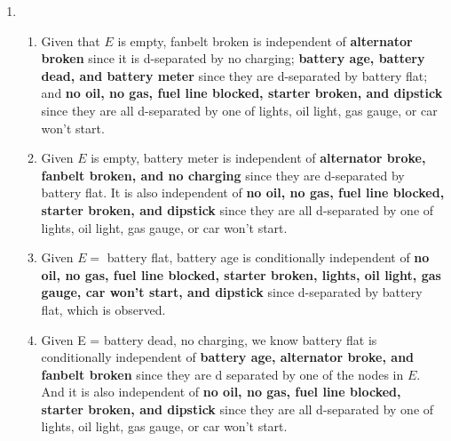 \documentclass[12pt,oneside,reqno]{amsart}
\theoremstyle{plain}
\theoremstyle{definition}
\theoremstyle{remark}
\newtheorem{rem}[theorem]{Remark}
\begin{document}
\begin{enumerate}[label=\arabic*.]
\begin{enumerate}
\item \textit{Prove that if $A$ and $B,C$ are conditionally independent given $D$, then $A,B$ are conditionally independent given $D$. }

\begin{proof}
Since $A$ and $B,C$ are conditionally independent given $D$, we know:
$$
P(A|B,C,D) = P(A|D).
$$
We want to show:
$$
P(A|B,D) = P(A|D).
$$
Note that $P(B) = P(B,C|P(C) = 1)$. So we have:
$$
P(A|B,D) = P(A|B,C,D|P(C) = 1) = P(A|D).
$$
So we have the desired result. 
\end{proof}
\end{enumerate}

\begin{rem}
Know this is as well, it's really easy, just $d$-separation. If there's any single directed path that isn't d separated, then they're dependent. 
\end{rem}

\item \begin{enumerate}
\item Given that $E$ is empty, fanbelt broken is independent of \textbf{alternator broken} since it is d-separated by no charging; \textbf{battery age, battery dead, and battery meter} since they are d-separated by battery flat; and \textbf{no oil, no gas, fuel line blocked, starter broken, and dipstick} since they are all d-separated by one of lights, oil light, gas gauge, or car won't start. 

\item Given $E$ is empty, battery meter is independent of \textbf{alternator broke, fanbelt broken, and no charging} since they are d-separated by battery flat. It is also independent of \textbf{no oil, no gas, fuel line blocked, starter broken, and dipstick} since they are all d-separated by one of lights, oil light, gas gauge, or car won't start. 

\item Given $E = $ battery flat, battery age is conditionally independent of \textbf{no oil, no gas, fuel line blocked, starter broken, lights, oil light, gas gauge, car won't start, and dipstick} since d-separated by battery flat, which is observed. 


\item Given E = battery dead, no charging, we know battery flat is conditionally independent of \textbf{battery age, alternator broke, and fanbelt broken} since they are d separated by one of the nodes in $E$. And it is also independent of \textbf{no oil, no gas, fuel line blocked, starter broken, and dipstick} since they are all d-separated by one of lights, oil light, gas gauge, or car won't start. 


\end{enumerate}
\end{enumerate}
\end{document}
